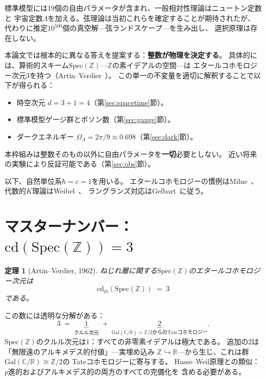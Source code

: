 \documentclass[12pt,a4paper]{article}
\newtheorem{theorem}{定理}[section]
\theoremstyle{definition}
\newcommand{\Spec}{\mathrm{Spec}}
\newcommand{\cd}{\mathrm{cd}}
\newcommand{\Gal}{\mathrm{Gal}}
\newcommand{\Z}{\mathbb{Z}}
\newcommand{\R}{\mathbb{R}}
\newcommand{\C}{\mathbb{C}}
\newcommand{\OmL}{\Omega_\Lambda}
\begin{document}
標準模型には19個の自由パラメータが含まれ、一般相対性理論はニュートン定数と
宇宙定数$\Lambda$を加える。弦理論は当初これらを確定することが期待されたが、
代わりに推定$10^{500}$個の真空解—弦ランドスケープ—を生み出し、
選択原理は存在しない。

本論文では根本的に異なる答えを提案する：\textbf{整数が物理を決定する}。
具体的には、算術的スキーム$\Spec(\Z)$—$\Z$の素イデアルの空間—は
エタールコホモロジー次元3を持つ（Artin--Verdier~\cite{ArtinVerdier}）。
この単一の不変量を適切に解釈することで以下が得られる：

\begin{itemize}
\item 時空次元 $d=3+1=4$（第\ref{sec:spacetime}節）。
\item 標準模型ゲージ群とボソン数（第\ref{sec:gauge}節）。
\item ダークエネルギー $\OmL=2\pi/9\approx 0.698$（第\ref{sec:dark}節）。
\end{itemize}

本枠組みは整数そのもの以外に自由パラメータを\textbf{一切}必要としない。
近い将来の実験により反証可能である（第\ref{sec:obs}節）。

以下、自然単位系$\hbar=c=1$を用いる。
エタールコホモロジーの慣例はMilne~\cite{Milne}、
代数的$K$理論はWeibel~\cite{Weibel}、
ラングランズ対応はGelbart~\cite{Gelbart}に従う。

\section{マスターナンバー：$\cd(\Spec(\Z))=3$}\label{sec:cd3}

\begin{theorem}[Artin--Verdier, 1962]\label{thm:AV}
ねじれ層に関する$\Spec(\Z)$のエタールコホモロジー次元は
\[
  \cd_{\text{\'et}}(\Spec(\Z)) \;=\; 3
\]
である。
\end{theorem}

この数には透明な分解がある：
\[
  3 \;=\; \underbrace{1}_{\text{クルル次元}}
        \;+\; \underbrace{2}_{\Gal(\C/\R)=\Z/2\text{からのTateコホモロジー}}.
\]
$\Spec(\Z)$のクルル次元は$1$：すべての非零素イデアルは極大である。
追加の$2$は「無限遠のアルキメデス的付値」—実埋め込み
$\Z\hookrightarrow\R$—から生じ、これは群$\Gal(\C/\R)\cong\Z/2$の
Tateコホモロジーに寄与する。
Hasse--Weil原理との類似：$p$進的およびアルキメデス的の両方のすべての完備化を
含める必要がある。
\end{document}

